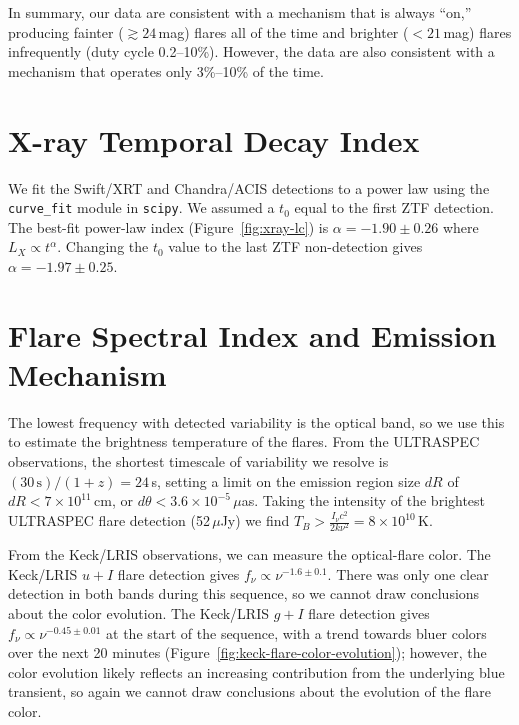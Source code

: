 \documentclass{nature_plusfigure}
\begin{document}
\begin{methods}
In summary, our data are consistent with a mechanism that is always ``on,'' producing fainter ($\gtrsim24$\,mag) flares all of the time and brighter ($<21\,$mag) flares infrequently (duty cycle 0.2--10\%). However, the data are also consistent with a mechanism that operates only 3\%--10\% of the time. 


\section{X-ray Temporal Decay Index}
\label{sec:xray-decay-index}

We fit the Swift/XRT and Chandra/ACIS detections to a power law using the \texttt{curve\_fit} module in \texttt{scipy}. We assumed a $t_0$ equal to the first ZTF detection. The best-fit power-law index (Figure~\ref{fig:xray-lc}) is $\alpha=-1.90\pm0.26$ where $L_X \propto t^{\alpha}$.
Changing the $t_0$ value to the last ZTF non-detection gives $\alpha=-1.97\pm0.25$.

\section{Flare Spectral Index and Emission Mechanism}
\label{sec:flare-emission-mechanism}

The lowest frequency with detected variability is the optical band, so we use this to estimate the brightness temperature of the flares.
From the ULTRASPEC observations, the shortest timescale of variability we resolve is $(30\,\mathrm{s})/(1+z) = 24\,$s, setting a limit on the emission region size $dR$ of $dR<7\times10^{11}\,$cm, or $d\theta < 3.6 \times 10^{-5}\,\mu$as. Taking the intensity of the brightest ULTRASPEC flare detection (52\,$\mu$Jy) we find $T_B > \frac{I_\nu c^2}{2 k\nu^2} = 8\times10^{10}\,$K.

From the Keck/LRIS observations, we can measure the optical-flare color. The Keck/LRIS $u+I$ flare detection gives $f_\nu \propto \nu^{-1.6\pm0.1}$. There was only one clear detection in both bands during this sequence, so we cannot draw conclusions about the color evolution. The Keck/LRIS $g+I$ flare detection gives $f_\nu \propto \nu^{-0.45\pm0.01}$ at the start of the sequence, with a trend towards bluer colors over the next 20 minutes (Figure~\ref{fig:keck-flare-color-evolution}); however, the color evolution likely reflects an increasing contribution from the underlying blue transient, so again we cannot draw conclusions about the evolution of the flare color.


\end{methods}
\end{document}
